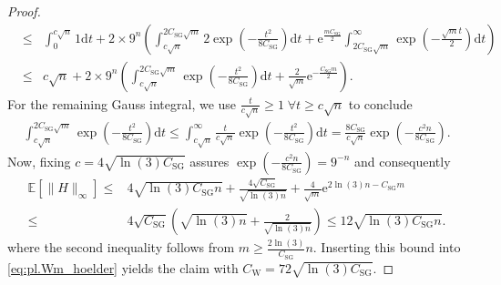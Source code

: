 \begin{proof}
\begin{align}
    &\leq& \int_0^{c \sqrt{n}} 1 \mathrm{d}t + 2 \times 9^n \left( \int_{c \sqrt{n}}^{2 C_\mathrm{SG} \sqrt{m}} 2 \exp \left( - \frac{t^2}{8 C_\mathrm{SG}} \right) \mathrm{d}t
     +  \mathrm{e}^{\frac{m C_\mathrm{SG}}{2}} \int_{2 C_\mathrm{SG} \sqrt{m}}^\infty \exp\left( - \frac{\sqrt{m}t}{2}  \right) \mathrm{d} t \right)\\
    &\leq & c \sqrt{n} + 2 \times 9^n \left( \int_{c \sqrt{n}}^{2 C_\mathrm{SG} \sqrt{m}}  \exp \left( - \frac{t^2}{8 C_\mathrm{SG}} \right) \mathrm{d}t + \frac{2}{\sqrt{m}} \mathrm{e}^{-\frac{C_\mathrm{SG} m}{2}}\right).
  \end{align}
  For the remaining Gauss integral, we use $\frac{t}{c \sqrt{n}} \geq 1\; \forall t \geq c\sqrt{n}$ to conclude
  \begin{align}
    \int_{c \sqrt{n}}^{2 C_\mathrm{SG} \sqrt{m}}  \exp \left( - \frac{t^2}{8 C_\mathrm{SG}} \right) \mathrm{d}t
    \leq  \int_{c \sqrt{n}}^\infty \frac{t}{c \sqrt{n}}  \exp \left( - \frac{t^2}{8 C_\mathrm{SG}} \right) \mathrm{d} t
    = \frac{8 C_\mathrm{SG}}{c \sqrt{n}} \exp \left( - \frac{c^2 n}{8 C_\mathrm{SG}} \right).
  \end{align}
  Now, fixing $c = 4 \sqrt{\ln (3)C_\mathrm{SG}}$ assures $\exp \left( -\frac{c^2 n}{8 C_\mathrm{SG}}\right) = 9^{-n}$ and consequently
  \begin{align}
    \mathbb{E} \left[ \|  H \|_\infty \right]
    \leq & 4  \sqrt{ \ln (3) C_\mathrm{SG} n} + \frac{4 \sqrt{C_\mathrm{SG}}}{\sqrt{ \ln (3) n}} + \frac{4}{\sqrt{m}} \mathrm{e}^{2 \ln (3) n - C_\mathrm{SG} m} \\
    \leq & 4\sqrt{C_\mathrm{SG}} \left( \sqrt{ \ln (3) n} + \frac{2}{\sqrt{ \ln (3) n}} \right) \leq 12 \sqrt{ \ln (3) C_\mathrm{SG} n}.
  \end{align}
  where the second inequality follows from $m \geq \frac{2 \ln (3)}{C_\mathrm{SG}} n$. Inserting this bound into \eqref{eq:pl.Wm_hoelder} yields the claim with $C_\mathrm{W} = 72 \sqrt{ \ln (3) C_\mathrm{SG}}$.
\end{proof}

